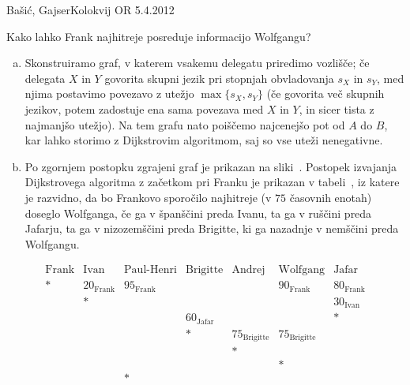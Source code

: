 \begin{naloga}{Bašić, Gajser}{Kolokvij OR 5.4.2012}
\begin{vprasanje}
\begin{enumerate}[(a)]
\bigskip
Kako lahko Frank najhitreje posreduje informacijo Wolfgangu?
\end{enumerate}
\end{vprasanje}

\begin{odgovor}
\begin{enumerate}[(a)]
\item Skonstruiramo graf, v katerem vsakemu delegatu priredimo vozlišče;
če delegata $X$ in $Y$ govorita skupni jezik
pri stopnjah obvladovanja $s_X$ in $s_Y$,
med njima postavimo povezavo z utežjo $\max\{s_X, s_Y\}$
(če govorita več skupnih jezikov,
potem zadostuje ena sama povezava med $X$ in $Y$,
in sicer tista z najmanjšo utežjo).
Na tem grafu nato poiščemo najcenejšo pot od $A$ do $B$,
kar lahko storimo z Dijkstrovim algoritmom,
saj so vse uteži nenegativne.

\item Po zgornjem postopku zgrajeni graf je prikazan na sliki~\fig.
Postopek izvajanja Dijkstrovega algoritma z začetkom pri Franku
je prikazan v tabeli~\tab,
iz katere je razvidno, da bo Frankovo sporočilo najhitreje
(v $75$ časovnih enotah) do\-seg\-lo Wolfganga,
če ga v španščini preda Ivanu,
ta ga v ruščini preda Jafarju,
ta ga v nizozemščini preda Brigitte,
ki ga nazadnje v nemščini preda Wolfgangu.
\end{enumerate}
%
\begin{slika}
\pgfslika
{}
\end{slika}
%
\begin{tabela}[h]
$$
\begin{array}{ccccccc}
\text{Frank} & \text{Ivan} & \text{Paul-Henri} & \text{Brigitte} & \text{Andrej} & \text{Wolfgang} & \text{Jafar} \\ \hline
* & 20_{\text{Frank}} & 95_{\text{Frank}} &&& 90_{\text{Frank}} & 80_{\text{Frank}} \\
& * &&&&& 30_{\text{Ivan}} \\
&&& 60_{\text{Jafar}} &&& * \\
&&& * & 75_{\text{Brigitte}} & 75_{\text{Brigitte}} & \\
&&&& * && \\
&&&&& * & \\
&& * &&&& \\
\end{array}
$$
\end{tabela}
\end{odgovor}
\end{naloga}
